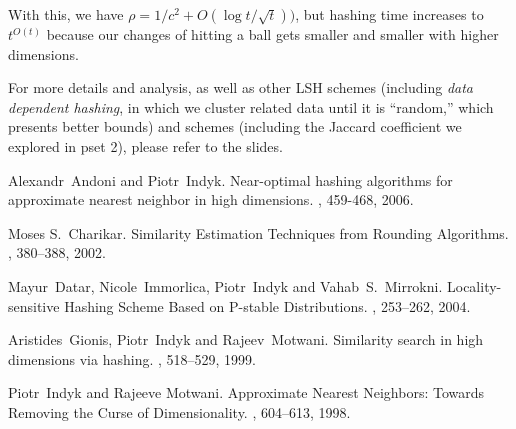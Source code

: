 \documentclass[11pt]{article}
\theoremstyle{definition}
\begin{document}
With this, we have $\rho = 1/c^2 + O(\log t/\sqrt{t}))$, but hashing time increases to $t^{O(t)}$ because our changes of hitting a ball gets smaller and smaller with higher dimensions.

For more details and analysis, as well as other LSH schemes (including \emph{data dependent hashing}, in which we cluster related data until it is ``random,'' which presents better bounds) and schemes (including the Jaccard coefficient we explored in pset 2), please refer to the slides.



\begin{thebibliography}{42}

Alexandr~Andoni and Piotr~Indyk.
\newblock Near-optimal hashing algorithms for approximate nearest neighbor in high dimensions.
, 459-468, 2006.

Moses S.~Charikar.
\newblock Similarity Estimation Techniques from Rounding Algorithms.
, 380--388, 2002.

Mayur~Datar, Nicole~Immorlica, Piotr~Indyk and Vahab~S.~Mirrokni.
\newblock Locality-sensitive Hashing Scheme Based on P-stable Distributions.
, 253--262, 2004.

Aristides~Gionis, Piotr~Indyk and Rajeev~Motwani.
\newblock Similarity search in high dimensions via hashing.
, 518--529, 1999.

Piotr~Indyk and Rajeeve Motwani.
\newblock Approximate Nearest Neighbors: Towards Removing the Curse of Dimensionality.
, 604--613, 1998.

\end{thebibliography}
\end{document}
